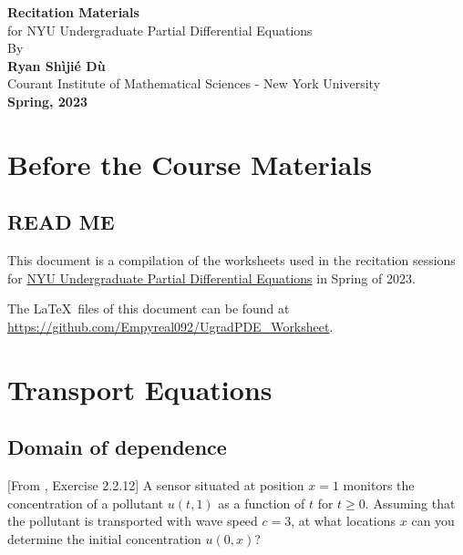 \documentclass[11pt,letterpaper]{report}
\begin{document}
\begin{titlepage}
    \begin{center}
        \vspace*{4cm}
        \Huge
        \textbf{Recitation Materials} \\
        \vspace{0.5cm}
        \LARGE
        {for NYU Undergraduate Partial Differential Equations}\\
        \vspace{3cm}
        By\\
        \vspace{0.5cm}
        \textbf{Ryan Sh\`iji\'e D\`u}\\
        \vspace{0.2cm}
        \normalsize
        {Courant Institute of Mathematical Sciences - New York University}\\
        \vspace{2cm}
        \Large
        \textbf{Spring, 2023}
        
    \end{center}
\end{titlepage}

\setcounter{tocdepth}{1}
\tableofcontents

\setcounter{chapter}{-1}
\chapter{Before the Course Materials}
\section{READ ME}
This document is a compilation of the worksheets used in the recitation sessions for \href{https://math.nyu.edu/dynamic/courses/undergrad/math-ua-263/}{NYU Undergraduate Partial Differential Equations} in Spring of 2023. 

The \LaTeX\ files of this document can be found at \url{https://github.com/Empyreal092/UgradPDE_Worksheet}.


\chapter{Transport Equations}
\section{Domain of dependence}
[From \cite{Olver_14}, Exercise 2.2.12] A sensor situated at position $x=1$ monitors the concentration of a pollutant $u(t,1)$ as a function of $t$ for $t\geq 0$. Assuming that the pollutant is transported with wave speed $c=3$, at what locations $x$ can you determine the initial concentration $u(0,x)$? 
\end{document}
